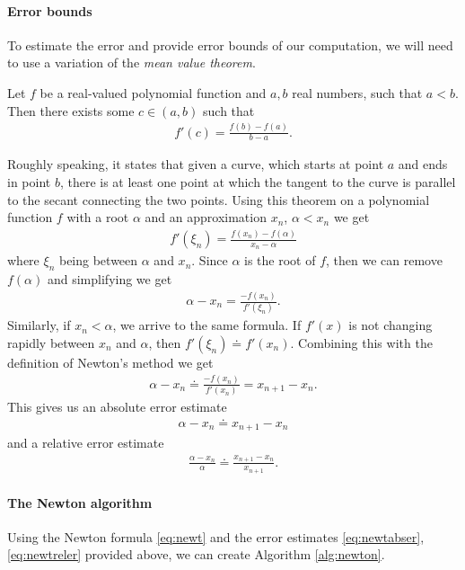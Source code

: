 \documentclass[
  digital, %
  notable,   %
  nolof,     %
  nolot,     %
	draft, %
]{fithesis3}
\begin{document}
\paragraph{Error bounds}
To estimate the error and provide error bounds of our computation, we will need to use a variation of the \emph{mean value theorem}.
\begin{theorem}
Let $f$ be a real-valued polynomial function and $a, b$ real numbers, such that $a < b$. Then there exists some $c\in(a, b)$ such that
\begin{align}
f'(c) = \frac{f(b) - f(a)}{b - a}.
\end{align}
\end{theorem}%
Roughly speaking, it states that given a curve, which starts at point $a$ and ends in point $b$, there is at least one point at which the tangent to the curve is parallel to the secant connecting the two points.
Using this theorem on a polynomial function $f$ with a root $\alpha$ and an approximation $x_{n}$, $\alpha < x_{n}$ we get 
\begin{align}
f'(\xi_n) = \frac{f(x_{n})-f(\alpha)}{x_{n}-\alpha}
\end{align}
where $\xi_{n}$ being between $\alpha$ and $x_{n}$. Since $\alpha$ is the root of $f$, then we can remove $f(\alpha)$ and simplifying we get
\begin{align}
\alpha - x_{n} = \frac{-f(x_{n})}{f'(\xi_n)}.
\end{align}
Similarly, if $x_{n} < \alpha$, we arrive to the same formula. If $f'(x)$ is not changing rapidly between $x_{n}$ and $\alpha$, then $f'(\xi_{n}) \doteq f'(x_{n})$. Combining this with the definition of Newton's method we get
\begin{align}
\alpha - x_{n} \doteq \frac{-f(x_{n})}{f'(x_{n})} = x_{n+1} - x_{n}.
\end{align}
This gives us an absolute error estimate
\begin{align}
\alpha - x_{n} \doteq x_{n+1} - x_{n} \label{eq:newtabser}
\end{align}
and a relative error estimate
\begin{align}
\frac{\alpha - x_{n}}{\alpha} \doteq \frac{x_{n+1} - x_{n}}{x_{n+1}}.\label{eq:newtreler}
\end{align}
\paragraph{The Newton algorithm}
Using the Newton formula \eqref{eq:newt} and the error estimates \eqref{eq:newtabser}, \eqref{eq:newtreler} provided above, we can create  Algorithm \ref{alg:newton}.
\end{document}
